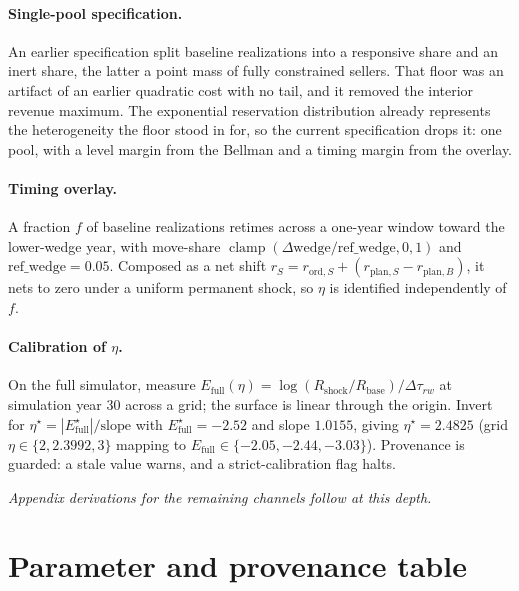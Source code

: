 \documentclass[11pt]{article}
\begin{document}
\paragraph{Single-pool specification.}
An earlier specification split baseline realizations into a responsive share and
an inert share, the latter a point mass of fully constrained sellers. That floor
was an artifact of an earlier quadratic cost with no tail, and it removed the
interior revenue maximum. The exponential reservation distribution already
represents the heterogeneity the floor stood in for, so the current
specification drops it: one pool, with a level margin from the Bellman and a
timing margin from the overlay.

\paragraph{Timing overlay.}
A fraction $f$ of baseline realizations retimes across a one-year window toward
the lower-wedge year, with move-share
$\operatorname{clamp}(\Delta\text{wedge}/\text{ref\_wedge},0,1)$ and
$\text{ref\_wedge}=0.05$. Composed as a net shift
$r_S=r_{\text{ord},S}+(r_{\text{plan},S}-r_{\text{plan},B})$, it nets to zero
under a uniform permanent shock, so $\eta$ is identified independently of $f$.

\paragraph{Calibration of $\eta$.}
On the full simulator, measure
$E_{\text{full}}(\eta)=\log(R_{\text{shock}}/R_{\text{base}})/\Delta\tau_{rw}$ at
simulation year 30 across a grid; the surface is linear through the origin.
Invert for $\eta^{\star}=|E_{\text{full}}^{\star}|/\text{slope}$ with
$E_{\text{full}}^{\star}=-2.52$ and slope $1.0155$, giving $\eta^{\star}=2.4825$
(grid $\eta\in\{2,2.3992,3\}$ mapping to
$E_{\text{full}}\in\{-2.05,-2.44,-3.03\}$). Provenance is guarded: a stale value
warns, and a strict-calibration flag halts.

\bigskip
\noindent\emph{Appendix derivations for the remaining channels follow at this
depth.}

\section{Parameter and provenance table}
\label{sec:app-params}
\end{document}
